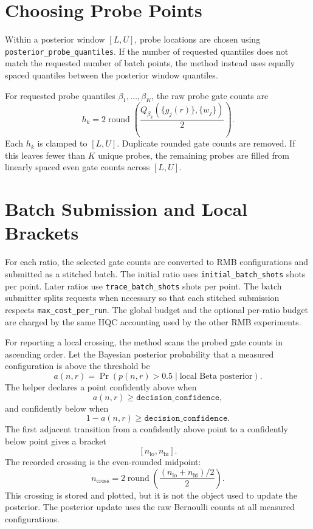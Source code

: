 \documentclass[11pt]{article}
\begin{document}
\section{Choosing Probe Points}

Within a posterior window $[L,U]$, probe locations are chosen using
\texttt{posterior\_probe\_quantiles}. If the number of requested quantiles does
not match the requested number of batch points, the method instead uses
equally spaced quantiles between the posterior window quantiles.

For requested probe quantiles $\beta_1,\ldots,\beta_K$, the raw probe gate
counts are
\[
    h_k =
    2\operatorname{round}
    \left(
        \frac{
        Q_{\beta_k}(\{g_j(r)\},\{w_j\})
        }{2}
    \right).
\]
Each $h_k$ is clamped to $[L,U]$. Duplicate rounded gate counts are removed.
If this leaves fewer than $K$ unique probes, the remaining probes are filled
from linearly spaced even gate counts across $[L,U]$.

\section{Batch Submission and Local Brackets}

For each ratio, the selected gate counts are converted to RMB configurations
and submitted as a stitched batch. The initial ratio uses
\texttt{initial\_batch\_shots} shots per point. Later ratios use
\texttt{trace\_batch\_shots} shots per point. The batch submitter splits
requests when necessary so that each stitched submission respects
\texttt{max\_cost\_per\_run}. The global budget and the optional per-ratio
budget are charged by the same HQC accounting used by the other RMB
experiments.

For reporting a local crossing, the method scans the probed gate counts in
ascending order. Let the Bayesian posterior probability that a measured
configuration is above the threshold be
\[
    a(n,r)=\Pr(p(n,r)>0.5\mid \text{local Beta posterior}).
\]
The helper declares a point confidently above when
\[
    a(n,r)\ge \texttt{decision\_confidence},
\]
and confidently below when
\[
    1-a(n,r)\ge \texttt{decision\_confidence}.
\]
The first adjacent transition from a confidently above point to a confidently
below point gives a bracket
\[
    [n_{\mathrm{lo}}, n_{\mathrm{hi}}].
\]
The recorded crossing is the even-rounded midpoint:
\[
    n_{\mathrm{cross}}
    =
    2\operatorname{round}
    \left(
        \frac{(n_{\mathrm{lo}}+n_{\mathrm{hi}})/2}{2}
    \right).
\]
This crossing is stored and plotted, but it is not the object used to update
the posterior. The posterior update uses the raw Bernoulli counts at all
measured configurations.
\end{document}
